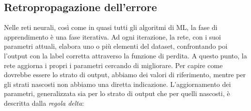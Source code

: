 








\subsection{Retropropagazione dell'errore}
Nelle reti neurali, così come in quasi tutti gli algoritmi di ML, la fase di apprendimento è una fase iterativa. Ad ogni iterazione, la rete, con i suoi parametri attuali, elabora uno o più elementi del dataset, confrontando poi l'output con la label corretta attraverso la funzione di perdita. A questo punto, la rete aggiorna i propri i parametri cercando di migliorare. Per capire come dovrebbe essere lo strato di output, abbiamo dei valori di riferimento, mentre per gli strati nascosti non abbiamo una diretta indicazione. L'aggiornamento dei parametri, generalizzata sia per lo strato di output che per quelli nascosti, è descritta dalla \textit{regola delta}:

